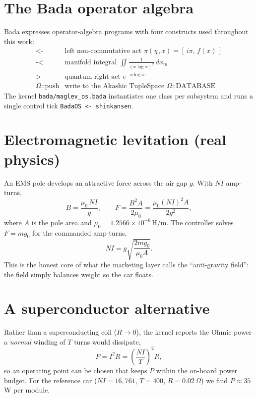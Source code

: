 \documentclass[11pt]{article}
\begin{document}
\section{The Bada operator algebra}
Bada expresses operator-algebra programs with four constructs used throughout
this work:
\[
\begin{array}{ll}
\texttt{<-} & \text{left non-commutative act } \pi(\chi,x)=[\,i\pi,\,f(x)\,]\\
\texttt{-<} & \text{manifold integral } \displaystyle\iint \frac{1}{(x\log x)^2}\,dx_m\\
\texttt{>-} & \text{quantum right act } e^{-x\log x}\\
\Omega\text{::push} & \text{write to the Akashic TupleSpace }\Omega\text{::DATABASE}
\end{array}
\]
The kernel \texttt{bada/maglev\_os.bada} instantiates one class per subsystem and
runs a single control tick \verb|BadaOS <- shinkansen|.

\section{Electromagnetic levitation (real physics)}
An EMS pole develops an attractive force across the air gap $g$. With $N I$
amp-turns,
\begin{equation}
B=\frac{\mu_0\,N I}{g},\qquad
F=\frac{B^2 A}{2\mu_0}=\frac{\mu_0 (N I)^2 A}{2 g^2},
\label{eq:lev}
\end{equation}
where $A$ is the pole area and $\mu_0=1.2566\times10^{-6}\,$H/m. The controller
solves $F=m g_0$ for the commanded amp-turns,
\begin{equation}
N I = g\sqrt{\frac{2 m g_0}{\mu_0 A}}.
\label{eq:ni}
\end{equation}
This is the honest core of what the marketing layer calls the ``anti-gravity
field'': the field simply balances weight so the car floats.

\section{A superconductor alternative}
Rather than a superconducting coil ($R\to0$), the kernel reports the Ohmic
power a \emph{normal} winding of $T$ turns would dissipate,
\begin{equation}
P = I^2 R = \left(\frac{N I}{T}\right)^{\!2} R,
\end{equation}
so an operating point can be chosen that keeps $P$ within the on-board power
budget. For the reference car ($NI=16{,}761$, $T=400$, $R=0.02\,\Omega$) we find
$P\approx 35\,$W per module.
\end{document}
